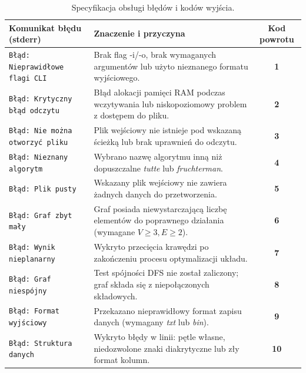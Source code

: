 \documentclass[12pt,a4paper]{article}
\begin{document}
\begin{table}[h]
    \centering
    \small
    \begin{tabularx}{\textwidth}{@{} l X c @{}}
        \toprule
        \textbf{Komunikat błędu (stderr)} & \textbf{Znaczenie i przyczyna} & \textbf{Kod powrotu} \\
        \midrule
        \texttt{Błąd: Nieprawidłowe flagi CLI} & Brak flag -i/-o, brak wymaganych argumentów lub użyto nieznanego formatu wyjściowego. & \textbf{1} \\
        \addlinespace
        \texttt{Błąd: Krytyczny błąd odczytu} & Błąd alokacji pamięci RAM podczas wczytywania lub niskopoziomowy problem z dostępem do pliku. & \textbf{2} \\
        \addlinespace
        \texttt{Błąd: Nie można otworzyć pliku} & Plik wejściowy nie istnieje pod wskazaną ścieżką lub brak uprawnień do odczytu. & \textbf{3} \\
        \addlinespace
        \texttt{Błąd: Nieznany algorytm} & Wybrano nazwę algorytmu inną niż dopuszczalne \textit{tutte} lub \textit{fruchterman}. & \textbf{4} \\
        \addlinespace
        \texttt{Błąd: Plik pusty} & Wskazany plik wejściowy nie zawiera żadnych danych do przetworzenia. & \textbf{5} \\
        \addlinespace
        \texttt{Błąd: Graf zbyt mały} & Graf posiada niewystarczającą liczbę elementów do poprawnego działania (wymagane $V \ge 3, E \ge 2$). & \textbf{6} \\
        \addlinespace
        \texttt{Błąd: Wynik nieplanarny} & Wykryto przecięcia krawędzi po zakończeniu procesu optymalizacji układu. & \textbf{7} \\
        \addlinespace
        \texttt{Błąd: Graf niespójny} & Test spójności DFS nie został zaliczony; graf składa się z niepołączonych składowych. & \textbf{8} \\
        \addlinespace
        \texttt{Błąd: Format wyjściowy} & Przekazano nieprawidłowy format zapisu danych (wymagany \textit{txt} lub \textit{bin}). & \textbf{9} \\
        \addlinespace
        \texttt{Błąd: Struktura danych} & Wykryto błędy w linii: pętle własne, niedozwolone znaki diakrytyczne lub zły format kolumn. & \textbf{10} \\
        \bottomrule
    \end{tabularx}
    \caption{Specyfikacja obsługi błędów i kodów wyjścia.}
\end{table}
\end{document}
